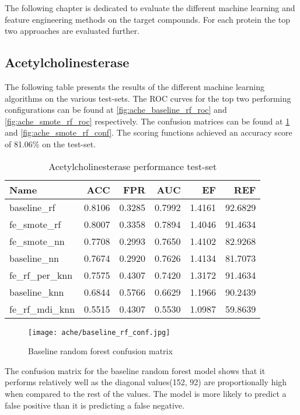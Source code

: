 \label{cha:performance_protein}
The following chapter is dedicated to evaluate the different machine learning and feature engineering methods on
the target compounds. For each protein the top two approaches are evaluated further.

\subsection{Acetylcholinesterase}
The following table presents the results of the different machine learning algorithms on the various
test-sets. The ROC curves for the top two performing configurations can be found at \ref{fig:ache_baseline_rf_roc} and \ref{fig:ache_smote_rf_roc}
respectively. The confusion matrices can be found at \ref{fig:ache_baseline_rf_conf} and \ref{fig:ache_smote_rf_conf}.
The scoring functions achieved an accuracy score of 81.06\% on the test-set.
\begin{table}[H]
    \begin{center}
        \caption{Acetylcholinesterase performance test-set}
        \begin{tabular}{lrrrrr}
            \toprule
            Name             & ACC    & FPR    & AUC    & EF     & REF     \\
            \midrule
            baseline\_rf     & 0.8106 & 0.3285 & 0.7992 & 1.4161 & 92.6829 \\
            fe\_smote\_rf    & 0.8007 & 0.3358 & 0.7894 & 1.4046 & 91.4634 \\
            fe\_smote\_nn    & 0.7708 & 0.2993 & 0.7650 & 1.4102 & 82.9268 \\
            baseline\_nn     & 0.7674 & 0.2920 & 0.7626 & 1.4134 & 81.7073 \\
            fe\_rf\_per\_knn & 0.7575 & 0.4307 & 0.7420 & 1.3172 & 91.4634 \\
            baseline\_knn    & 0.6844 & 0.5766 & 0.6629 & 1.1966 & 90.2439 \\
            fe\_rf\_mdi\_knn & 0.5515 & 0.4307 & 0.5530 & 1.0987 & 59.8639 \\
            \bottomrule
        \end{tabular}
    \end{center}
\end{table}

\begin{figure}[H]
    \begin{center}
        \caption[]{Baseline random forest confusion matrix}
        \label{fig:ache_baseline_rf_conf}
        \texttt{[image: ache/baseline\_rf\_conf.jpg]}
    \end{center}
\end{figure}
The confusion matrix for the baseline random forest model shows that it performs relatively well as the diagonal values(152, 92) are proportionally high
when compared to the rest of the values. The model is more likely to predict a false positive than it is predicting a false negative.  

